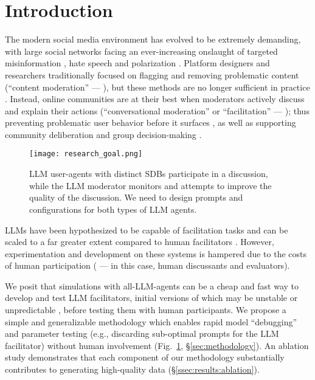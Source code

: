 %
\section{Introduction}
\label{sec:introduction}

The modern social media environment has evolved to be extremely demanding, with large social networks facing an ever-increasing onslaught of targeted misinformation \cite{clemons2025disinformation, Denniss2025Social}, hate speech \cite{kolluri2025parler} and polarization \cite{pranesh2024impactsocialmediapolarization}.
Platform designers and researchers traditionally focused on flagging and removing problematic content (``content moderation'' --- \citet{seering_self_moderation, cresci_pesonalized_interventions}), but these methods are no longer sufficient in practice \cite{horta_automated_moderation, schaffner_community_guidelines, small-polis-llm, korre2025evaluation}. Instead, online communities are at their best when moderators actively discuss and explain their actions (``conversational moderation'' or ``facilitation'' --- \citet{argyle2023, korre2025evaluation, falk-etal-2021-predicting}); thus preventing problematic user behavior before it surfaces \cite{cho-etal-2024-language, seering_self_moderation, cresci_pesonalized_interventions, make_reddit_great}, as well as supporting community deliberation and group decision-making \cite{kim_et_al_chatbot, seering_self_moderation}. 

\begin{figure}[t]
	\centering
	\texttt{[image: research\_goal.png]}
	\caption{\ac{LLM} user-agents with distinct \acp{SDB} participate in a discussion, while the \ac{LLM} moderator monitors and attempts to improve the quality of the discussion. We need to design prompts and configurations for both types of \ac{LLM} agents.}
	\label{fig::goals}
\end{figure}

\acfp{LLM} have been hypothesized to be capable of facilitation tasks and can be scaled to a far greater extent compared to human facilitators \cite{korre2025evaluation, small-polis-llm}. However, experimentation and development on these systems is hampered due to the costs of human participation (\citet{rossi_2024} --- in this case, human discussants and evaluators). 

We posit that simulations with all-\ac{LLM}-agents can be a cheap and fast way to develop and test  \ac{LLM} facilitators, initial versions of which may be unstable or unpredictable \cite{atil_2025, rossi_2024}, before testing them with human participants. We propose a simple and generalizable methodology which enables rapid model “debugging” and parameter testing (e.g., discarding sub-optimal  prompts for the \ac{LLM} facilitator) without human involvement (Fig.~\ref{fig::goals}, \S\ref{sec:methodology}). An ablation study demonstrates that each component of our methodology substantially contributes to generating high-quality data (\S\ref{ssec:results:ablation}). 

